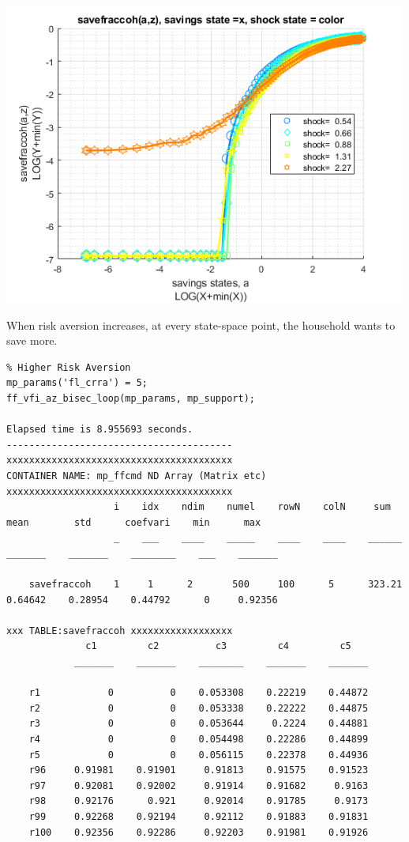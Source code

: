 \documentclass[
]{book}
\begin{document}
\includegraphics[width=5.20833in,height=\textheight]{img/fx_vfi_az_bisec_loop_images/figure_3.png}

When risk aversion increases, at every state-space point, the household
wants to save more.

\begin{verbatim}
% Higher Risk Aversion
mp_params('fl_crra') = 5;
ff_vfi_az_bisec_loop(mp_params, mp_support);

Elapsed time is 8.955693 seconds.
----------------------------------------
xxxxxxxxxxxxxxxxxxxxxxxxxxxxxxxxxxxxxxxx
CONTAINER NAME: mp_ffcmd ND Array (Matrix etc)
xxxxxxxxxxxxxxxxxxxxxxxxxxxxxxxxxxxxxxxx
                   i    idx    ndim    numel    rowN    colN     sum       mean        std      coefvari    min      max  
                   _    ___    ____    _____    ____    ____    ______    _______    _______    ________    ___    _______

    savefraccoh    1     1      2       500     100      5      323.21    0.64642    0.28954    0.44792      0     0.92356

xxx TABLE:savefraccoh xxxxxxxxxxxxxxxxxx
              c1         c2          c3         c4         c5   
            _______    _______    ________    _______    _______

    r1            0          0    0.053308    0.22219    0.44872
    r2            0          0    0.053338    0.22222    0.44875
    r3            0          0    0.053644     0.2224    0.44881
    r4            0          0    0.054498    0.22286    0.44899
    r5            0          0    0.056115    0.22378    0.44936
    r96     0.91981    0.91901     0.91813    0.91575    0.91523
    r97     0.92081    0.92002     0.91914    0.91682     0.9163
    r98     0.92176      0.921     0.92014    0.91785     0.9173
    r99     0.92268    0.92194     0.92112    0.91883    0.91831
    r100    0.92356    0.92286     0.92203    0.91981    0.91926
\end{verbatim}
\end{document}
